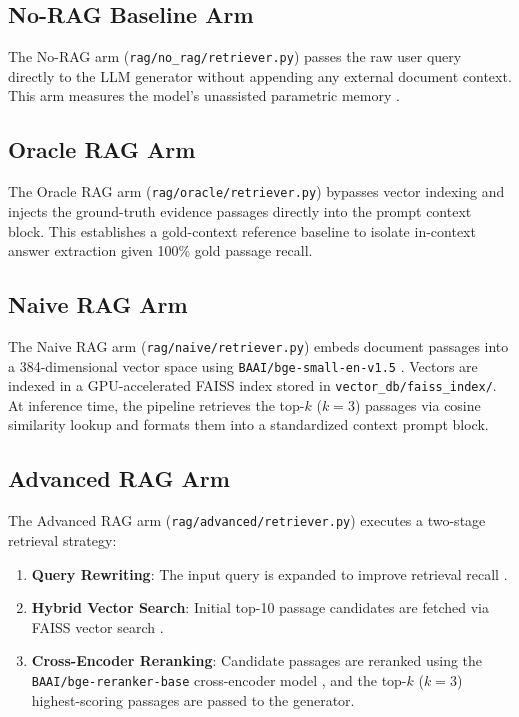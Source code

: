 \documentclass[conference]{IEEEtran}
\begin{document}
\subsection{No-RAG Baseline Arm}
The No-RAG arm (\texttt{rag/no\_rag/retriever.py}) passes the raw user query directly to the LLM generator without appending any external document context. This arm measures the model's unassisted parametric memory \cite{mallen2023when}.

\subsection{Oracle RAG Arm}
The Oracle RAG arm (\texttt{rag/oracle/retriever.py}) bypasses vector indexing and injects the ground-truth evidence passages directly into the prompt context block. This establishes a gold-context reference baseline to isolate in-context answer extraction given 100\% gold passage recall.

\subsection{Naive RAG Arm}
The Naive RAG arm (\texttt{rag/naive/retriever.py}) embeds document passages into a 384-dimensional vector space using \texttt{BAAI/bge-small-en-v1.5} \cite{bge2023embedding}. Vectors are indexed in a GPU-accelerated FAISS index \cite{johnson2019billion} stored in \texttt{vector\_db/faiss\_index/}. At inference time, the pipeline retrieves the top-$k$ ($k=3$) passages via cosine similarity lookup \cite{lewis2020retrieval} and formats them into a standardized context prompt block.

\subsection{Advanced RAG Arm}
The Advanced RAG arm (\texttt{rag/advanced/retriever.py}) executes a two-stage retrieval strategy:
\begin{enumerate}
    \item \textbf{Query Rewriting}: The input query is expanded to improve retrieval recall \cite{ma2023query}.
    \item \textbf{Hybrid Vector Search}: Initial top-10 passage candidates are fetched via FAISS vector search \cite{johnson2019billion}.
    \item \textbf{Cross-Encoder Reranking}: Candidate passages are reranked using the \texttt{BAAI/bge-reranker-base} cross-encoder model \cite{nogueira2019passage, bge2023embedding}, and the top-$k$ ($k=3$) highest-scoring passages are passed to the generator.
\end{enumerate}
\end{document}

